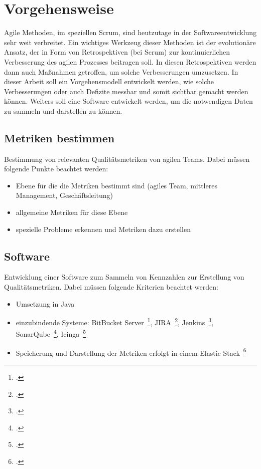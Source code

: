\chapter{Vorgehensweise}

Agile Methoden, im speziellen Scrum, sind heutzutage in der Softwareentwicklung sehr weit verbreitet.
Ein wichtiges Werkzeug dieser Methoden ist der evolutionäre Ansatz, der in Form von Retrospektiven (bei Scrum) zur kontinuierlichen Verbesserung des agilen Prozesses beitragen soll.
In diesen Retrospektiven werden dann auch Maßnahmen getroffen, um solche Verbesserungen umzusetzen.
In dieser Arbeit soll ein Vorgehensmodell entwickelt werden, wie solche Verbesserungen oder auch Defizite messbar und somit sichtbar gemacht werden können.
Weiters soll eine Software entwickelt werden, um die notwendigen Daten zu sammeln und darstellen zu können.

\section{Metriken bestimmen}

Bestimmung von relevanten Qualitätsmetriken von agilen Teams.
Dabei müssen folgende Punkte beachtet werden:
\begin{itemize}[noitemsep]
    \item Ebene für die die Metriken bestimmt sind (agiles Team, mittleres Management, Geschäftsleitung)
    \item allgemeine Metriken für diese Ebene
    \item spezielle Probleme erkennen und Metriken dazu erstellen
\end{itemize}

\newpage
\section{Software}\label{vorgehen:software}

Entwicklung einer Software zum Sammeln von Kennzahlen zur Erstellung von Qualitätsmetriken. 
Dabei müssen folgende Kriterien beachtet werden:
\begin{itemize}[noitemsep]
    \item Umsetzung in Java
    \item einzubindende Systeme: BitBucket Server~\footcite{bitbucket_server}, JIRA~\footcite{jira}, Jenkins~\footcite{jenkins}, SonarQube~\footcite{sonarqube}, Icinga~\footcite{icinga}
    \item Speicherung und Darstellung der Metriken erfolgt in einem Elastic Stack~\footcite{elastic_stack}
\end{itemize}
